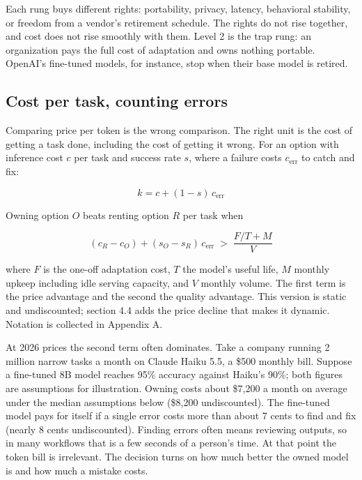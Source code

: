 Each rung buys different rights: portability, privacy, latency, behavioral stability, or freedom from a vendor's retirement schedule. The rights do not rise together, and cost does not rise smoothly with them. Level 2 is the trap rung: an organization pays the full cost of adaptation and owns nothing portable. OpenAI's fine-tuned models, for instance, stop when their base model is retired.

\subsection{Cost per task, counting errors}

Comparing price per token is the wrong comparison. The right unit is the cost of getting a task done, including the cost of getting it wrong. For an option with inference cost $c$ per task and success rate $s$, where a failure costs $c_{\mathrm{err}}$ to catch and fix:

\begin{equation}\label{eq:taskcost}
k = c + (1 - s)\, c_{\text{err}}
\end{equation}

Owning option $O$ beats renting option $R$ per task when

\begin{equation}\label{eq:breakeven}
(c_R - c_O) + (s_O - s_R)\, c_{\text{err}} \;>\; \frac{F/T + M}{V}
\end{equation}

\noindent where $F$ is the one-off adaptation cost, $T$ the model's useful life, $M$ monthly upkeep including idle serving capacity, and $V$ monthly volume. The first term is the price advantage and the second the quality advantage. This version is static and undiscounted; section 4.4 adds the price decline that makes it dynamic. Notation is collected in Appendix A.

At 2026 prices the second term often dominates.  Take a company running 2 million narrow tasks a month on Claude Haiku 5.5, a \$500 monthly bill. Suppose a fine-tuned 8B model reaches 95\% accuracy against Haiku's 90\%; both figures are assumptions for illustration. Owning costs about \$7,200 a month on average under the median assumptions below (\$8,200 undiscounted). The fine-tuned model pays for itself if a single error costs more than about 7 cents to find and fix (nearly 8 cents undiscounted). Finding errors often means reviewing outputs, so in many workflows that is a few seconds of a person's time. At that point the token bill is irrelevant. The decision turns on how much better the owned model is and how much a mistake costs.

